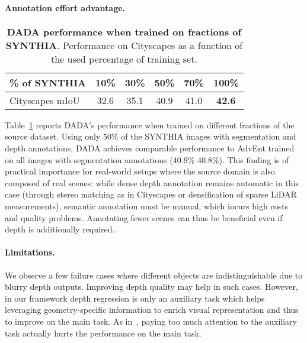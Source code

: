 \documentclass[10pt,twocolumn,letterpaper]{article}
\begin{document}
\paragraph{Annotation effort advantage.}
\begin{table}[t]
	\vspace{-0.2cm}
	\begin{center}
		\setlength{\tabcolsep}{5pt}
		\begin{tabular}{l|ccccc}
			\rule{0pt}{3ex}\% of SYNTHIA &10\%&30\%&50\%&70\%&100\%\\
			\hline
			\rule{0pt}{3ex}Cityscapes mIoU &32.6&35.1&40.9&41.0&\textbf{42.6}
		\end{tabular}
	\end{center}
	\vspace{-0.5cm}
	\caption{\small \textbf{DADA performance when trained on fractions of SYNTHIA}. Performance on Cityscapes as a function of the used percentage of training set.}
	\vspace{-0.4cm}
	\label{tbl:abl_percentage}
\end{table}
Table~\ref{tbl:abl_percentage} reports DADA's performance when trained on different fractions of the source dataset. Using only $50\%$ of the SYNTHIA images with segmentation and depth annotations, DADA achieves comparable performance to AdvEnt trained on all images with segmentation annotations ($40.9\%$ \vs $40.8\%$). This finding is of practical importance for real-world setups where the source domain is also composed of real scenes: while dense depth annotation remains automatic in this case (through stereo matching as in Cityscapes or densification of sparse LiDAR measurements), semantic annotation must be manual, which incurs high costs and quality problems. Annotating fewer scenes can thus be beneficial even if depth is additionally required.

\vspace{-0.3cm}
\paragraph{Limitations.}
We observe a few failure cases where different objects are indistinguishable due to blurry depth outputs.
Improving depth quality may help in such cases.
However, in our framework depth regression is only an auxiliary task which 
helps leveraging geometry-specific information to enrich visual representation and thus to improve on the main task.
As in~\cite{mordan2018revisiting}, paying too much attention to the auxiliary task actually hurts the performance on the main task. 	
\end{document}

